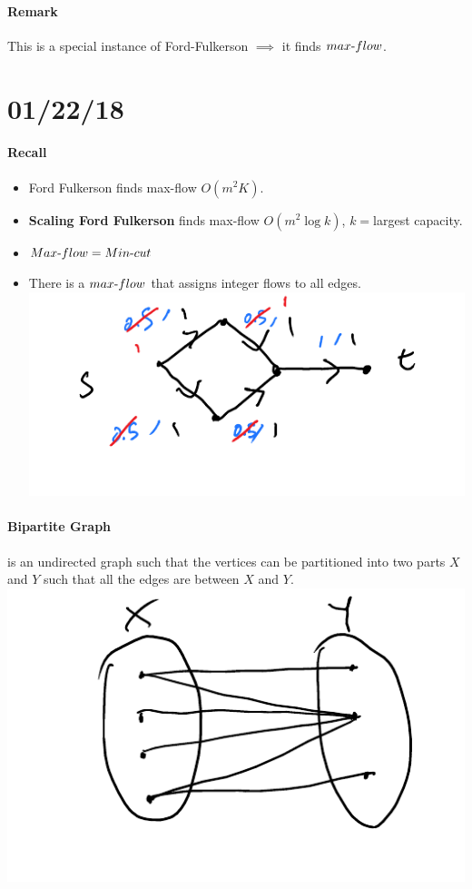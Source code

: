 \documentclass[12 pt]{article}
\begin{document}
        \paragraph{Remark} This is a special instance of
        Ford-Fulkerson $\implies$ it finds $max\hbox{-}flow$.
        \section{01/22/18}
        \paragraph{Recall}
        \begin{itemize}
        \item Ford Fulkerson finds max\hbox{-}flow $O(m^2K)$.
        \item \textbf{Scaling Ford Fulkerson} finds max\hbox{-}flow $O(m^2 \log k)$,
          $k=$largest capacity.
        \item $Max\hbox{-}flow=Min\hbox{-}cut$
        \item There is a $max\hbox{-}flow$ that assigns integer flows
          to all edges.
          \\ \includegraphics[width=.9\textwidth]{i42.pdf}
        \end{itemize}
        \paragraph{Bipartite Graph} is an undirected graph such that
        the vertices can be partitioned into two parts $X$ and $Y$
        such that all the edges are between $X$ and $Y$.
        \\ \includegraphics[width=.9\textwidth]{i43.pdf}
\end{document}
